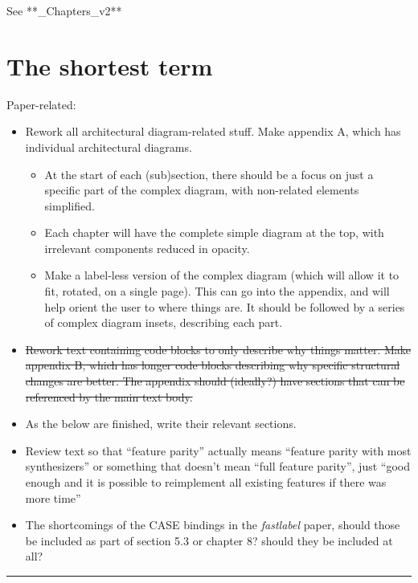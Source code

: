See **\_Chapters\_v2**

\section{The shortest term}\label{the-shortest-term}

Paper-related:

\begin{itemize}
\tightlist
\item
  Rework all architectural diagram-related stuff. Make appendix A, which
  has individual architectural diagrams.

  \begin{itemize}
  \tightlist
  \item
    At the start of each (sub)section, there should be a focus on just a
    specific part of the complex diagram, with non-related elements
    simplified.
  \item
    Each chapter will have the complete simple diagram at the top, with
    irrelevant components reduced in opacity.
  \item
    Make a label-less version of the complex diagram (which will allow
    it to fit, rotated, on a single page). This can go into the
    appendix, and will help orient the user to where things are. It
    should be followed by a series of complex diagram insets, describing
    each part.
  \end{itemize}
\item
  \st{Rework text containing code blocks to only describe why things
  matter. Make appendix B, which has longer code blocks describing why
  specific structural changes are better. The appendix should (ideally?)
  have sections that can be referenced by the main text body.}
\item
  As the below are finished, write their relevant sections.
\item
  Review text so that ``feature parity'' actually means ``feature parity
  with most synthesizers'' or something that doesn't mean ``full feature
  parity'', just ``good enough and it is possible to reimplement all
  existing features if there was more time''
\item
  The shortcomings of the CASE bindings in the \emph{fastlabel} paper,
  should those be included as part of section 5.3 or chapter 8? should
  they be included at all?
\end{itemize}

\begin{center}\rule{0.5\linewidth}{0.5pt}\end{center}


